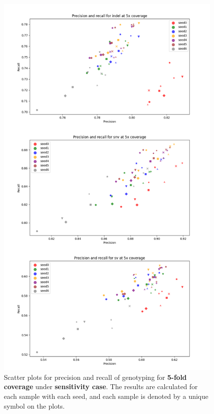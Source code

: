 \documentclass{PHlab-thesis}
\begin{document}
\clearpage
\begin{figure}[ht!]
	\centering
	\includegraphics[scale=0.5]{figures/Sensitivity_genotyping_5x.png}
	\caption{Scatter plots for precision and recall of genotyping for \textbf{5-fold coverage} under \textbf{sensitivity case}. The results are calculated for each sample with each seed, and each sample is denoted by a unique symbol on the plots.}
	\label{fig:sensitivity_genotyping_5x} %
\end{figure}
\end{document}
